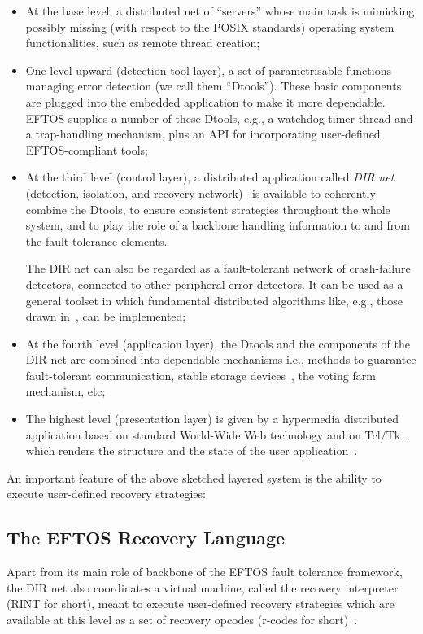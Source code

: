 \documentclass[11pt]{article}
\begin{document}
\begin{itemize}
\item At the base level, a distributed net of ``servers'' whose
main task is mimicking possibly missing (with respect to the POSIX
standards) operating system functionalities, such as remote thread creation;

\item One level upward (detection tool layer), a set of parametrisable functions managing error
detection (we call them ``Dtools''). 
These basic components are plugged into the embedded
application to make it more dependable. EFTOS supplies a number of these
Dtools, e.g., a watchdog timer thread and a trap-handling
mechanism, plus an API for incorporating user-defined EFTOS-com\-pli\-ant tools; 

\item At the third level (control layer), a distributed application called {\em DIR net\/}
(detection, isolation, and recovery network)~\cite{TrDe97a} is available 
to coherently combine the Dtools, to ensure consistent strategies throughout the
whole system, and to play the role of a backbone handling information 
to and from the fault tolerance elements.

The DIR net can also be regarded as a fault-tolerant network of
crash-failure detectors, connected to other peripheral error detectors.
It can be used as a general toolset in which fundamental 
distributed algorithms like, e.g., those drawn in~\cite{ChTu96},
can be implemented;


\item At the fourth level (application layer), the Dtools and the components of
the DIR net are combined into dependable
mechanisms i.e., methods to guarantee fault-tolerant communication, 
stable storage devices~\cite{DBCD98},
the voting farm mechanism, etc;

\item The highest level (presentation layer) is given by
a hypermedia distributed application based on standard World-Wide Web
technology and on Tcl/Tk~\cite{Oust94}, which renders the structure and the state 
of the user application~\cite{DeDT97a}.
\end{itemize}

An important feature of the above sketched layered system is the ability to
execute user-defined recovery strategies:

\subsection{The EFTOS Recovery Language}\label{trl}
Apart from its main role of backbone of the EFTOS fault tolerance
framework, the DIR net also coordinates a virtual machine, called
the recovery interpreter (RINT for short), meant to execute
user-defined recovery strategies which are available at this level as
a set of recovery opcodes (r-codes for short)~\cite{DeFl97c}.
\end{document}
